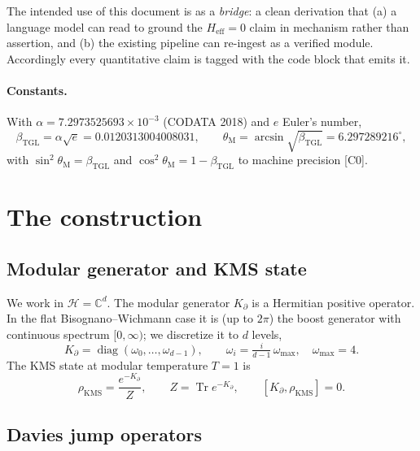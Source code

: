 \documentclass[11pt,a4paper]{article}
\theoremstyle{plain}
\theoremstyle{definition}
\newcommand{\Kp}{K_{\partial}}
\newcommand{\beTGL}{\beta_{\mathrm{TGL}}}
\newcommand{\rhoKMS}{\rho_{\mathrm{KMS}}}
\newcommand{\Tr}{\operatorname{Tr}}
\newcommand{\thetaM}{\theta_{\mathrm{M}}}
\newcommand{\Heff}{H_{\mathrm{eff}}}
\newcommand{\status}[1]{{\small\textsf{[#1]}}}
\begin{document}
The intended use of this document is as a \emph{bridge}: a clean derivation that
(a) a language model can read to ground the $\Heff=0$ claim in mechanism rather
than assertion, and (b) the existing pipeline can re-ingest as a verified module.
Accordingly every quantitative claim is tagged with the code block that emits it.

\paragraph{Constants.}
With $\alpha = 7.2973525693\times10^{-3}$ (CODATA 2018) and $e$ Euler's number,
\begin{equation}
  \beTGL = \alpha\sqrt{e} = 0.0120313004008031,
  \qquad
  \thetaM = \arcsin\sqrt{\beTGL} = 6.297289216^{\circ},
\end{equation}
with $\sin^2\thetaM = \beTGL$ and $\cos^2\thetaM = 1-\beTGL$ to machine
precision \status{C0}.

\section{The construction}\label{sec:construction}

\subsection{Modular generator and KMS state}

We work in $\mathcal{H}=\mathbb{C}^d$. The modular generator $\Kp$ is a
Hermitian positive operator. In the flat Bisognano--Wichmann case it is (up to
$2\pi$) the boost generator with continuous spectrum $[0,\infty)$; we discretize
it to $d$ levels,
\begin{equation}
  \Kp = \operatorname{diag}(\omega_0,\dots,\omega_{d-1}),
  \qquad \omega_i = \tfrac{i}{d-1}\,\omega_{\max},
  \quad \omega_{\max}=4 .
  \label{eq:Kdiag}
\end{equation}
The KMS state at modular temperature $T=1$ is
\begin{equation}
  \rhoKMS = \frac{e^{-\Kp}}{Z}, \qquad Z=\Tr e^{-\Kp},
  \qquad [\Kp,\rhoKMS]=0 .
  \label{eq:kms}
\end{equation}

\subsection{Davies jump operators}
\end{document}
